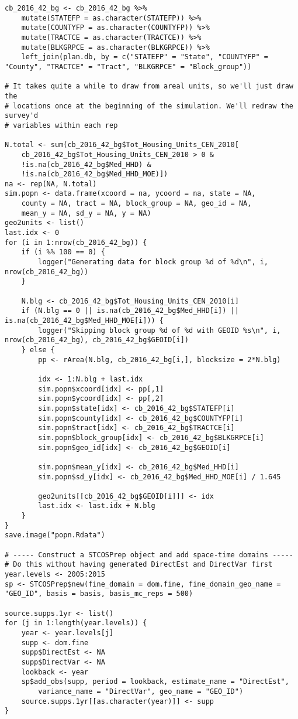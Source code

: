 \documentclass[12pt]{article}
\begin{document}
\begin{scriptsize}
\begin{verbatim}
cb_2016_42_bg <- cb_2016_42_bg %>%
	mutate(STATEFP = as.character(STATEFP)) %>%
	mutate(COUNTYFP = as.character(COUNTYFP)) %>%
	mutate(TRACTCE = as.character(TRACTCE)) %>%
	mutate(BLKGRPCE = as.character(BLKGRPCE)) %>%
	left_join(plan.db, by = c("STATEFP" = "State", "COUNTYFP" = "County", "TRACTCE" = "Tract", "BLKGRPCE" = "Block_group"))

# It takes quite a while to draw from areal units, so we'll just draw the
# locations once at the beginning of the simulation. We'll redraw the survey'd
# variables within each rep

N.total <- sum(cb_2016_42_bg$Tot_Housing_Units_CEN_2010[
	cb_2016_42_bg$Tot_Housing_Units_CEN_2010 > 0 &
	!is.na(cb_2016_42_bg$Med_HHD) &
	!is.na(cb_2016_42_bg$Med_HHD_MOE)])
na <- rep(NA, N.total)
sim.popn <- data.frame(xcoord = na, ycoord = na, state = NA,
	county = NA, tract = NA, block_group = NA, geo_id = NA,
	mean_y = NA, sd_y = NA, y = NA)
geo2units <- list()
last.idx <- 0
for (i in 1:nrow(cb_2016_42_bg)) {
	if (i %% 100 == 0) {
		logger("Generating data for block group %d of %d\n", i, nrow(cb_2016_42_bg))
	}

	N.blg <- cb_2016_42_bg$Tot_Housing_Units_CEN_2010[i]
	if (N.blg == 0 || is.na(cb_2016_42_bg$Med_HHD[i]) || is.na(cb_2016_42_bg$Med_HHD_MOE[i])) {
		logger("Skipping block group %d of %d with GEOID %s\n", i, nrow(cb_2016_42_bg), cb_2016_42_bg$GEOID[i])
	} else {
		pp <- rArea(N.blg, cb_2016_42_bg[i,], blocksize = 2*N.blg)

		idx <- 1:N.blg + last.idx
		sim.popn$xcoord[idx] <- pp[,1]
		sim.popn$ycoord[idx] <- pp[,2]
		sim.popn$state[idx] <- cb_2016_42_bg$STATEFP[i]
		sim.popn$county[idx] <- cb_2016_42_bg$COUNTYFP[i]
		sim.popn$tract[idx] <- cb_2016_42_bg$TRACTCE[i]
		sim.popn$block_group[idx] <- cb_2016_42_bg$BLKGRPCE[i]
		sim.popn$geo_id[idx] <- cb_2016_42_bg$GEOID[i]
		
		sim.popn$mean_y[idx] <- cb_2016_42_bg$Med_HHD[i]
		sim.popn$sd_y[idx] <- cb_2016_42_bg$Med_HHD_MOE[i] / 1.645

		geo2units[[cb_2016_42_bg$GEOID[i]]] <- idx
		last.idx <- last.idx + N.blg
	}
}
save.image("popn.Rdata")

# ----- Construct a STCOSPrep object and add space-time domains -----
# Do this without having generated DirectEst and DirectVar first
year.levels <- 2005:2015
sp <- STCOSPrep$new(fine_domain = dom.fine, fine_domain_geo_name = "GEO_ID", basis = basis, basis_mc_reps = 500)

source.supps.1yr <- list()
for (j in 1:length(year.levels)) {
	year <- year.levels[j]
	supp <- dom.fine
	supp$DirectEst <- NA
	supp$DirectVar <- NA
	lookback <- year
	sp$add_obs(supp, period = lookback, estimate_name = "DirectEst",
		variance_name = "DirectVar", geo_name = "GEO_ID")
	source.supps.1yr[[as.character(year)]] <- supp
}


\end{verbatim}
\end{scriptsize}
\end{document}
